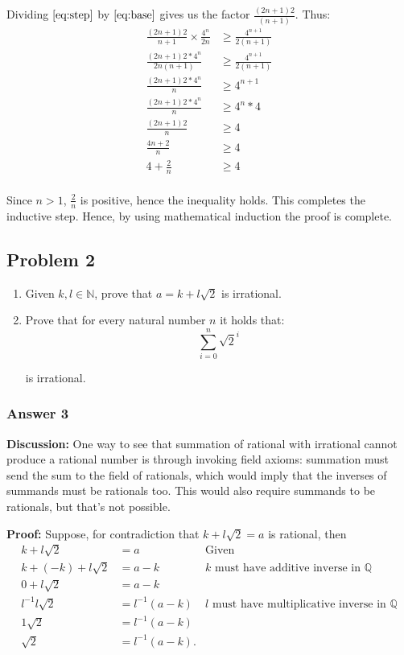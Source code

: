 \documentclass[11pt]{article}
\begin{document}
Dividing $\ref{eq:step}$ by $\ref{eq:base}$ gives us the factor $\frac{(2n+1)2}{(n+1)}$. Thus:
\begin{align*}
  \frac{(2n+1)2}{n+1} \times \frac{4^n}{2n} &\geq \frac{4^{n+1}}{2(n+1)} \\
  \frac{(2n+1)2*4^n}{2n(n+1)} &\geq \frac{4^{n+1}}{2(n+1)} \\
  \frac{(2n+1)2*4^n}{n} &\geq 4^{n+1} \\
  \frac{(2n+1)2*4^n}{n} &\geq 4^{n}*4 \\
  \frac{(2n+1)2}{n} &\geq 4 \\
  \frac{4n+2}{n} &\geq 4 \\
  4 + \frac{2}{n} &\geq 4 \\
\end{align*}

Since $n > 1$, $\frac{2}{n}$ is positive, hence the inequality holds.
This completes the inductive step.  Hence, by using mathematical induction
the proof is complete.
\subsection{Problem 2}
\label{sec-1-2}
\begin{enumerate}
\item Given $k, l \in \mathbb{N}$, prove that $a=k+l\sqrt{2}$ is irrational.
\item Prove that for every natural number $n$ it holds that:
\begin{equation*}
   \sum_{i=0}^n \sqrt{2}^i
\end{equation*}

is irrational.
\end{enumerate}

\subsubsection{Answer 3}
\label{sec-1-2-1}
\textbf{Discussion:} One way to see that summation of rational with irrational
cannot produce a rational number is through invoking field axioms: summation
must send the sum to the field of rationals, which would imply that the
inverses of summands must be rationals too.  This would also require summands
to be rationals, but that's not possible.

\textbf{Proof:} Suppose, for contradiction that $k+l\sqrt{2}=a$ is rational, then
\begin{equation*}
  \begin{aligned}
    k+l\sqrt{2} &= a & \textrm{Given} \\
    k+(-k)+l\sqrt{2} &= a-k &
    \textrm{$k$ must have additive inverse in $\mathbb{Q}$} \\
    0+l\sqrt{2} &= a-k \\
    l^{-1}l\sqrt{2} &= l^{-1}(a-k) &
    \textrm{$l$ must have multiplicative inverse in $\mathbb{Q}$} \\
    1\sqrt{2} &= l^{-1}(a-k) \\
    \sqrt{2} &= l^{-1}(a-k).
  \end{aligned}
\end{equation*}
\end{document}
